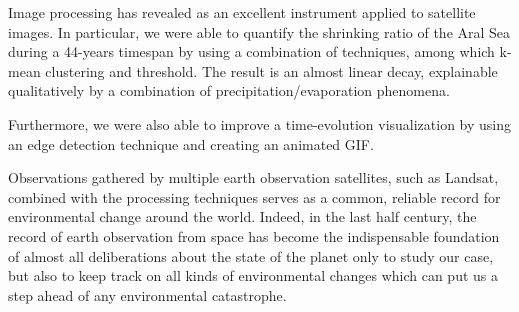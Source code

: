 Image processing has revealed as an excellent instrument applied to satellite images. 
In particular, we were able to quantify the shrinking ratio of the Aral Sea during a 44-years timespan by using a combination of techniques, among which k-mean clustering and threshold. 
The result is an almost linear decay, explainable qualitatively by a combination of precipitation/evaporation phenomena.

Furthermore, we were also able to improve a time-evolution visualization by using an edge detection technique and creating an animated GIF.

Observations gathered by multiple earth observation satellites, such as Landsat, combined with the processing techniques serves as a common, reliable record for environmental change around the world. 
Indeed, in the last half century, the record of earth observation from space has become the indispensable foundation of almost all deliberations about the state of the planet only to study our case, but also to keep track on all kinds of environmental changes which can put us a step ahead of any environmental catastrophe.
